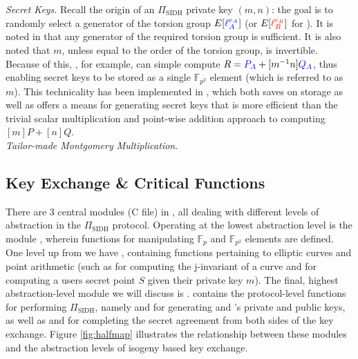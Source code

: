 \noindent
\emph{Secret Keys}. Recall the origin of an $\Pi_{\text{SIDH}}$ private key $(m, n)$: the goal is to randomly select a generator of the torsion group $E[\textcolor{blue}{\ell_{A}^{e_A}}]$ (or $E[\textcolor{red}{\ell_{B}^{e_B}}]$ for \bob). It is noted in \cite{djp} that any generator of the required torsion group is sufficient. It is also noted that $m$, unless equal to the order of the torsion group, is invertible. Because of this, \alice, for example, can simple compute $R = \textcolor{blue}{P_A} + [m^{-1}n]\textcolor{blue}{Q_A}$, thus enabling secret keys to be stored as a single $\mathbb{F}_{p^2}$ element (which is referred to as $m$). This technicality has been implemented in \sidh, which both saves on storage as well as offers a means for generating secret keys that is more efficient than the trivial scalar multiplication and point-wise addition approach to computing $[m]P + [n]Q$.\\

\noindent
\emph{Tailor-made Montgomery Multiplication}.

\subsection{Key Exchange \& Critical Functions}

There are 3 central modules (C file) in \sidh, all dealing with different levels of abstraction in the $\Pi_{\text{SIDH}}$ protocol. Operating at the lowest abstraction level is the module , wherein functions for manipulating $\mathbb{F}_{p}$ and $\mathbb{F}_{p^2}$ elements are defined. One level up from  we have , containing functions pertaining to elliptic curves and point arithmetic (such as  for computing the j-invariant of a curve and  for computing a users secret point $S$ given their private key $m$). The final, highest abstraction-level module we will discuss is .  contains the protocol-level functions for performing $\Pi_{\text{SIDH}}$, namely  and  for generating \alice and \bob's private and public keys, as well as  and  for completing the secret agreement from both sides of the key exchange. Figure \ref{fig:halfmap} illustrates the relationship between these modules and the abstraction levels of isogeny based key exchange.

